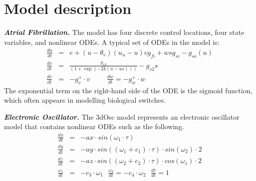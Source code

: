 \section{Model description}\label{apndx:model}

\textbf{\textit{Atrial Fibrillation.}} The model has four discrete control locations, four state variables, and nonlinear ODEs. A typical set of ODEs in the model is:
\begin{eqnarray*}
\frac{du}{dt} &=& e + (u-\theta_v)(u_u-u ) v g_{fi} + wsg_{si}-g_{so}(u)\\
\frac{ds}{dt} &=& \displaystyle\frac{g_{s2}}{(1+\exp(-2k(u-us)))} -  g_{s2}s\\
\frac{dv}{dt} &=& -g_v^+\cdot v \hspace{1cm} \frac{dw}{dt} = -g_w^+\cdot w
\end{eqnarray*}
The exponential term on the right-hand side of the ODE is the sigmoid function, which often appears in modelling biological switches.

\textbf{\textit{Electronic Oscillator.}} The 3dOsc model represents an electronic oscillator model that contains nonlinear ODEs such as the following.
\begin{eqnarray*}
\frac{dx}{dt} &=& - ax \cdot sin(\omega_1 \cdot \tau)\\
\frac{dy}{dt} &=& - ay \cdot sin( (\omega_1 + c_1) \cdot \tau) \cdot sin(\omega_2)\cdot 2\\
\frac{dz}{dt} &=& - az \cdot sin( (\omega_2 + c_2) \cdot \tau) \cdot cos(\omega_1)\cdot 2\\
\frac{\omega_1}{dt} &=& - c_3\cdot \omega_1\ \ \ \frac{\omega_2}{dt} = -c_4\cdot\omega_2\ \ \ \frac{d\tau}{dt} = 1
\end{eqnarray*}

